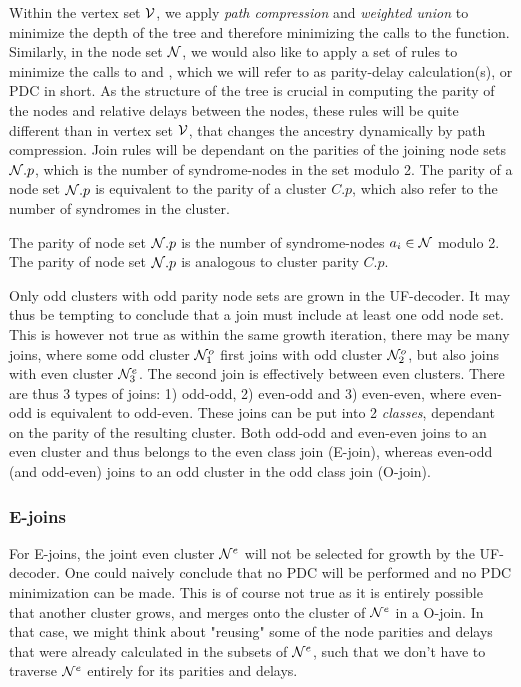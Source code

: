 Within the vertex set $\mathcal{V}$, we apply \emph{path compression} and \emph{weighted union} to minimize the depth of the tree and therefore minimizing the calls to the  function. Similarly, in the node set $\mathcal{N}$, we would also like to apply a set of rules to minimize the calls to  and , which we will refer to as parity-delay calculation(s), or PDC in short. As the structure of the tree is crucial in computing the parity of the nodes and relative delays between the nodes, these rules will be quite different than in vertex set $\mathcal{V}$, that changes the ancestry dynamically by path compression. Join rules will be dependant on the parities of the joining node sets $\mathcal{N}.p$, which is the number of syndrome-nodes in the set modulo 2. The parity of a node set $\mathcal{N}.p$ is equivalent to the parity of a cluster $C.p$, which also refer to the number of syndromes in the cluster.
\begin{lemma}
  The parity of node set $\mathcal{N}.p$ is the number of syndrome-nodes $a_i \in \mathcal{N}$ modulo 2. The parity of node set $\mathcal{N}.p$ is analogous to cluster parity $C.p$.
\end{lemma}

Only odd clusters with odd parity node sets are grown in the UF-decoder. It may thus be tempting to conclude that a join must include at least one odd node set. This is however not true as within the same growth iteration, there may be many joins, where some odd cluster $\mathcal{N}_1^o$ first joins with odd cluster $\mathcal{N}_2^o$, but also joins with even cluster $\mathcal{N}_3^e$. The second join is effectively between even clusters. There are thus 3 types of joins: 1) odd-odd, 2) even-odd and 3) even-even, where even-odd is equivalent to odd-even. These joins can be put into 2 \emph{classes}, dependant on the parity of the resulting cluster. Both odd-odd and even-even joins to an even cluster and thus belongs to the even class join (E-join), whereas even-odd (and odd-even) joins to an odd cluster in the odd class join (O-join).


\subsubsection{E-joins}

For E-joins, the joint even cluster $\mathcal{N}^e$ will not be selected for growth by the UF-decoder. One could naively conclude that no PDC will be performed and no PDC minimization can be made. This is of course not true as it is entirely possible that another cluster grows, and merges onto the cluster of $\mathcal{N}^{e}$ in a O-join. In that case, we might think about "reusing" some of the node parities and delays that were already calculated in the subsets of $\mathcal{N}^e$, such that we don't have to traverse $\mathcal{N}^{e}$ entirely for its parities and delays.

